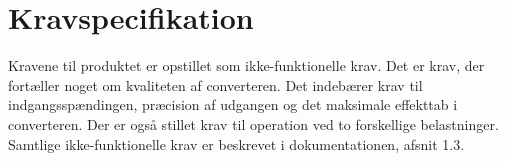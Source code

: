 \section{Kravspecifikation}
Kravene til produktet er opstillet som ikke-funktionelle krav. Det er krav, der fortæller noget om kvaliteten af converteren. Det indebærer krav til indgangsspændingen, præcision af udgangen og det maksimale effekttab i converteren. Der er også stillet krav til operation ved to forskellige belastninger. Samtlige ikke-funktionelle krav er beskrevet i dokumentationen, afsnit 1.3.

